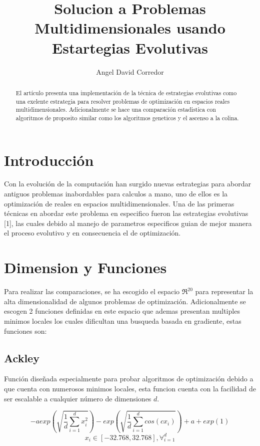 \documentclass[twocolumn]{IEEEtran}
\begin{document}
\title{Solucion a Problemas Multidimensionales usando Estartegias Evolutivas}
\author{Angel David Corredor}
\date{}
\maketitle

\begin{abstract}
    El artículo presenta una implementación de la técnica de estrategias evolutivas
    como una exelente estrategia para resolver problemas de optimización en espacios
    reales multidimensionales. Adicionalmente se hace una comparación estadistica con
    algoritmos de proposito similar como los algoritmos geneticos y el ascenso a la colina. 
\end{abstract}

\section{Introducción}

Con la evolución de la computación han surgido nuevas estrategias para abordar antiguos problemas
inabordables para calculos a mano, uno de ellos es la optimización de reales en espacios 
multidimensionales. Una de las primeras técnicas en abordar este problema en especifico fueron
las estrategias evolutivas [1],
las cuales debido al manejo de parametros especificos guian de mejor manera el proceso evolutivo
y en consecuencia el de optimización.

\section{Dimension y Funciones}

Para realizar las comparaciones, se ha escogido el espacio $\Re^{20}$ para representar la alta
dimensionalidad de algunos problemas de optimización. Adicionalmente se escogen 2 funciones 
definidas en este espacio que ademas presentan multiples minimos locales los cuales dificultan
una busqueda basada en gradiente, estas funciones son:

\subsection{Ackley}
Función diseñada especialmente para probar algoritmos de optimización debido a que cuenta con
numerosos minimos locales, esta funcion cuenta con la facilidad de ser escalable a cualquier 
número de dimensiones $d$.

$$
-a exp(\sqrt{\frac{1}{d} \sum_{i=1}^d{x_i^2}})
- exp(\sqrt{\frac{1}{d} \sum_{i=1}^d{cos(c x_i)}}) + a + exp(1)
$$
$$ x_i \in [-32.768, 32.768], \forall_{i=1}^d$$
\end{document}
